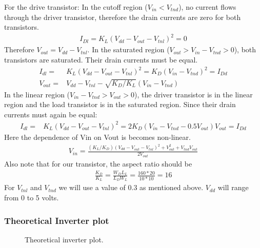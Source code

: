 \documentclass{article}
\begin{document}
For the drive transistor: In the cutoff region ($V_{in}<V_{tnd}$), no current flows through the driver transistor, therefore the drain currents are zero for both transistors.
\begin{align*}
I_{Dl} = K_L(V_{dd} - V_{out} - V_{tnl})^2 = 0
\end{align*}
Therefore $V_{out} = V_{dd} - V_{tnl}$. In the saturated region ($V_{out} >V_{in}-V_{tnd}>0$), both transistors are saturated. Their drain currents must be equal.
\begin{align*}
I_{dl} =& K_L(V_{dd} - V_{out} - V_{tnl})^2 = K_D(V_{in} - V_{tnd})^2 = I_{Dd} \\
V_{out} =& V_{dd} - V_{tnl} - \sqrt{K_D/K_L}(V_{in} - V_{tnd})
\end{align*}
In the linear region ($V_{in}-V_{tnd}>V_{out} >0$), the driver transistor is in the linear region and the load transistor is in the saturated region. Since their drain currents must again be equal:
\begin{align*}
I_{dl} =& K_L(V_{dd} - V_{out} - V_{tnl})^2 = 2K_D(V_{in} - V_{tnd} - 0.5V_{out})V_{out} = I_{Dd}
\end{align*}
Here the dependence of Vin on Vout is becomes non-linear. 
\begin{align*}
V_{in} = \frac{(K_L/K_D)(V_{dd} - V_{out} - V_{tnl})^2 + V_{out}^2 + V_{tnd}V_{out}}{2V_{out}}
\end{align*}
Also note that for our transistor, the aspect ratio should be
\begin{align*}
\frac{K_D}{K_L} = \frac{W_DL_L}{L_DW_L} = \frac{160*20}{10*10} = 16
\end{align*}
For $V_{tnl}$ and $V_{tnd}$ we will use a value of 0.3 as mentioned above. $V_{dd}$ will range from 0 to 5 volts.

\subsubsection{Theoretical Inverter plot}
\begin{figure}[H]
\centering
{}
\caption{Theoretical inverter plot.}
\end{figure}
\end{document}
